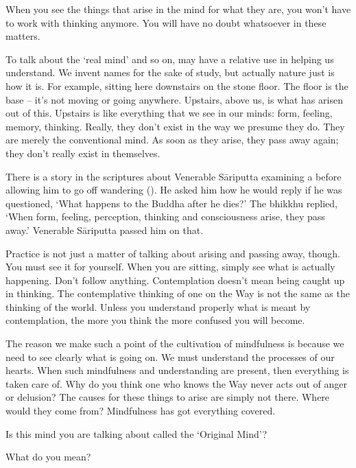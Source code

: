 When you see the things that arise in the mind for what they are, you won't have to work with thinking anymore. You will have no doubt whatsoever in these matters.

To talk about the `real mind' and so on, may have a relative use in helping us understand. We invent names for the sake of study, but actually nature just is how it is. For example, sitting here downstairs on the stone floor. The floor is the base -- it's not moving or going anywhere. Upstairs, above us, is what has arisen out of this. Upstairs is like everything that we see in our minds: form, feeling, memory, thinking. Really, they don't exist in the way we presume they do. They are merely the conventional mind. As soon as they arise, they pass away again; they don't really exist in themselves.

There is a story in the scriptures about Venerable S\=ariputta examining a  before allowing him to go off wandering (). He asked him how he would reply if he was questioned, `What happens to the Buddha after he dies?' The bhikkhu replied, `When form, feeling, perception, thinking and consciousness arise, they pass away.' Venerable S\=ariputta passed him on that.

Practice is not just a matter of talking about arising and passing away, though. You must see it for yourself. When you are sitting, simply see what is actually happening. Don't follow anything. Contemplation doesn't mean being caught up in thinking. The contemplative thinking of one on the Way is not the same as the thinking of the world. Unless you understand properly what is meant by contemplation, the more you think the more confused you will become.

The reason we make such a point of the cultivation of mindfulness is because we need to see clearly what is going on. We must understand the processes of our hearts. When such mindfulness and understanding are present, then everything is taken care of. Why do you think one who knows the Way never acts out of anger or delusion? The causes for these things to arise are simply not there. Where would they come from? Mindfulness has got everything covered.

Is this mind you are talking about called the `Original Mind'?

What do you mean?

